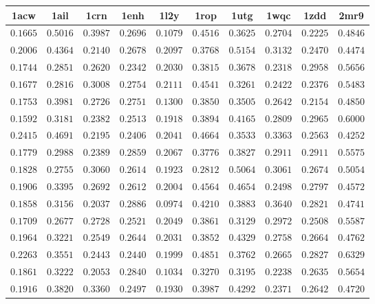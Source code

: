 \centering
\begin{longtable}{c|c|c|c|c|c|c|c|c|c}
1acw & 1ail & 1crn & 1enh & 1l2y & 1rop & 1utg & 1wqc & 1zdd & 2mr9 \\ \hline \hline
$0.1665$ & $0.5016$ & $0.3987$ & $0.2696$ & $0.1079$ & $0.4516$ & $0.3625$ & $0.2704$ & $0.2225$ & $0.4846$ \\ \hline
$0.2006$ & $0.4364$ & $0.2140$ & $0.2678$ & $0.2097$ & $0.3768$ & $0.5154$ & $0.3132$ & $0.2470$ & $0.4474$ \\ \hline
$0.1744$ & $0.2851$ & $0.2620$ & $0.2342$ & $0.2030$ & $0.3815$ & $0.3678$ & $0.2318$ & $0.2958$ & $0.5656$ \\ \hline
$0.1677$ & $0.2816$ & $0.3008$ & $0.2754$ & $0.2111$ & $0.4541$ & $0.3261$ & $0.2422$ & $0.2376$ & $0.5483$ \\ \hline
$0.1753$ & $0.3981$ & $0.2726$ & $0.2751$ & $0.1300$ & $0.3850$ & $0.3505$ & $0.2642$ & $0.2154$ & $0.4850$ \\ \hline
$0.1592$ & $0.3181$ & $0.2382$ & $0.2513$ & $0.1918$ & $0.3894$ & $0.4165$ & $0.2809$ & $0.2965$ & $0.6000$ \\ \hline
$0.2415$ & $0.4691$ & $0.2195$ & $0.2406$ & $0.2041$ & $0.4664$ & $0.3533$ & $0.3363$ & $0.2563$ & $0.4252$ \\ \hline
$0.1779$ & $0.2988$ & $0.2389$ & $0.2859$ & $0.2067$ & $0.3776$ & $0.3827$ & $0.2911$ & $0.2911$ & $0.5575$ \\ \hline
$0.1828$ & $0.2755$ & $0.3060$ & $0.2614$ & $0.1923$ & $0.2812$ & $0.5064$ & $0.3061$ & $0.2674$ & $0.5054$ \\ \hline
$0.1906$ & $0.3395$ & $0.2692$ & $0.2612$ & $0.2004$ & $0.4564$ & $0.4654$ & $0.2498$ & $0.2797$ & $0.4572$ \\ \hline
$0.1858$ & $0.3156$ & $0.2037$ & $0.2886$ & $0.0974$ & $0.4210$ & $0.3883$ & $0.3640$ & $0.2821$ & $0.4741$ \\ \hline
$0.1709$ & $0.2677$ & $0.2728$ & $0.2521$ & $0.2049$ & $0.3861$ & $0.3129$ & $0.2972$ & $0.2508$ & $0.5587$ \\ \hline
$0.1964$ & $0.3221$ & $0.2549$ & $0.2644$ & $0.2031$ & $0.3852$ & $0.4329$ & $0.2758$ & $0.2664$ & $0.4762$ \\ \hline
$0.2263$ & $0.3551$ & $0.2443$ & $0.2440$ & $0.1999$ & $0.4851$ & $0.3762$ & $0.2665$ & $0.2827$ & $0.6329$ \\ \hline
$0.1861$ & $0.3222$ & $0.2053$ & $0.2840$ & $0.1034$ & $0.3270$ & $0.3195$ & $0.2238$ & $0.2635$ & $0.5654$ \\ \hline
$0.1916$ & $0.3820$ & $0.3360$ & $0.2497$ & $0.1930$ & $0.3987$ & $0.4292$ & $0.2371$ & $0.2642$ & $0.4720$ \\ \hline

\end{longtable}
